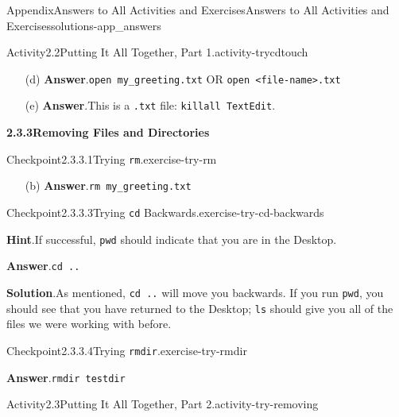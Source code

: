 \documentclass[oneside,10pt,]{book}
\newcommand{\blocktitlefont}{\relax}
\newcommand{\mono}[1]{\texttt{#1}}
\begin{document}
\begin{solutions-chapter}{Appendix}{Answers to All Activities and Exercises}{}{Answers to All Activities and Exercises}{}{}{solutions-app_answers}
\begin{activitysolution}{Activity}{2.2}{Putting It All Together, Part 1.}{activity-trycdtouch}
\begin{enumerate}[font=\bfseries,label=(\alph*),ref=\alph*]
\item[(d)]\noindent\textbf{\blocktitlefont Answer}.\hypertarget{answer-trycdtouch-g-b-back}{}\quad{}\mono{open my\_greeting.txt} OR \mono{open <file-name>.txt}%
\item[(e)]\noindent\textbf{\blocktitlefont Answer}.\hypertarget{answer-trycdtouch-h-b-back}{}\quad{}This is a \mono{.txt} file: \mono{killall TextEdit}.%
\end{enumerate}%
\end{activitysolution}%
\par\medskip
\noindent\textbf{\Large{}2.3.3\space\textperiodcentered\space{}Removing Files and Directories}
\begin{inlinesolution}{Checkpoint}{2.3.3.1}{Trying \mono{rm}.}{exercise-try-rm}%
\begin{enumerate}[font=\bfseries,label=(\alph*),ref=\alph*]%
\item[(b)]\noindent\textbf{\blocktitlefont Answer}.\hypertarget{answer-try-rm-c-b-back}{}\quad{}\mono{rm my\_greeting.txt}%
\end{enumerate}%
\end{inlinesolution}%
\begin{inlinesolution}{Checkpoint}{2.3.3.3}{Trying \mono{cd} Backwards.}{exercise-try-cd-backwards}%
\par\smallskip%
\noindent\textbf{\blocktitlefont Hint}.\hypertarget{hint-try-cd-backwards-c-back}{}\quad{}If successful, \mono{pwd} should indicate that you are in the Desktop.%
\par\smallskip%
\noindent\textbf{\blocktitlefont Answer}.\hypertarget{answer-try-cd-backwards-d-back}{}\quad{}\mono{cd ..}%
\par\smallskip%
\noindent\textbf{\blocktitlefont Solution}.\hypertarget{solution-try-cd-backwards-e-back}{}\quad{}As mentioned, \mono{cd ..} will move you backwards. If you run \mono{pwd}, you should see that you have returned to the Desktop; \mono{ls} should give you all of the files we were working with before.%
\end{inlinesolution}%
\begin{inlinesolution}{Checkpoint}{2.3.3.4}{Trying \mono{rmdir}.}{exercise-try-rmdir}%
\par\smallskip%
\noindent\textbf{\blocktitlefont Answer}.\hypertarget{answer-try-rmdir-c-back}{}\quad{}\mono{rmdir testdir}%
\end{inlinesolution}%
\begin{activitysolution}{Activity}{2.3}{Putting It All Together, Part 2.}{activity-try-removing}%

\end{activitysolution}
\end{solutions-chapter}
\end{document}
